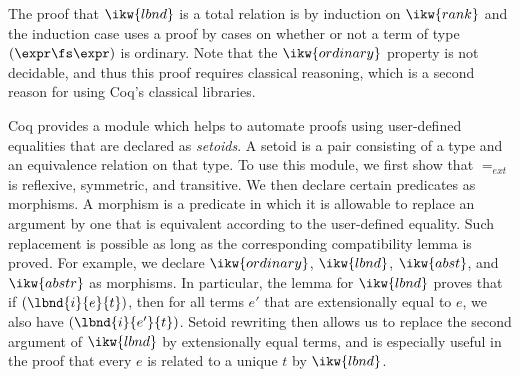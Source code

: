 \documentclass[final]{svjour3}
\begin{document}
The proof that $\ikw{lbnd}$ is a total relation is by induction on
$\ikw{rank}$ and
the induction case uses a proof by cases on whether or not a term of
type $(\expr \fs \expr)$ is ordinary.  Note that the $\ikw{ordinary}$
property is not decidable, and thus this proof requires classical
reasoning, which is a second reason for using Coq's classical
libraries.

Coq provides a module which helps to automate proofs using
user-defined equalities that are declared as \emph{setoids}.  A setoid
is a pair consisting of a type and an equivalence relation on that
type.  To use this module, we first show that $=_{ext}$ is reflexive,
symmetric, and transitive.  We then declare certain predicates as
morphisms.  A morphism is a predicate in which it is allowable to
replace an argument by one that is equivalent according to the user-defined
equality.  Such replacement is possible as long as the corresponding
compatibility lemma is proved.  For example, we declare
$\ikw{ordinary}$, $\ikw{lbnd}$, $\ikw{abst}$, and $\ikw{abstr}$ as
morphisms.  In particular, the lemma for $\ikw{lbnd}$ proves that if
$(\lbnd{i}{e}{t})$, then for all terms $e'$ that are extensionally
equal to $e$, we also have $(\lbnd{i}{e'}{t})$.  Setoid rewriting then
allows us to replace the second argument of $\ikw{lbnd}$ by
extensionally equal terms, and is especially useful in the proof that
every $e$ is related to a unique $t$ by $\ikw{lbnd}$.
\end{document}

